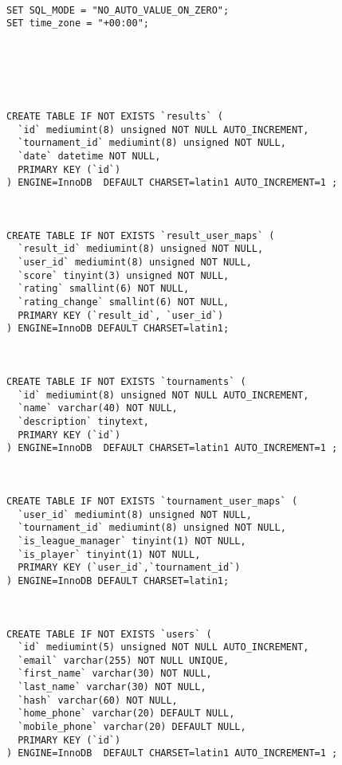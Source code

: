 {\scriptsize
\begin{lstlisting}

SET SQL_MODE = "NO_AUTO_VALUE_ON_ZERO";
SET time_zone = "+00:00";






CREATE TABLE IF NOT EXISTS `results` (
  `id` mediumint(8) unsigned NOT NULL AUTO_INCREMENT,
  `tournament_id` mediumint(8) unsigned NOT NULL,
  `date` datetime NOT NULL,
  PRIMARY KEY (`id`)
) ENGINE=InnoDB  DEFAULT CHARSET=latin1 AUTO_INCREMENT=1 ;



CREATE TABLE IF NOT EXISTS `result_user_maps` (
  `result_id` mediumint(8) unsigned NOT NULL,
  `user_id` mediumint(8) unsigned NOT NULL,
  `score` tinyint(3) unsigned NOT NULL,
  `rating` smallint(6) NOT NULL,
  `rating_change` smallint(6) NOT NULL,
  PRIMARY KEY (`result_id`, `user_id`)
) ENGINE=InnoDB DEFAULT CHARSET=latin1;



CREATE TABLE IF NOT EXISTS `tournaments` (
  `id` mediumint(8) unsigned NOT NULL AUTO_INCREMENT,
  `name` varchar(40) NOT NULL,
  `description` tinytext,
  PRIMARY KEY (`id`)
) ENGINE=InnoDB  DEFAULT CHARSET=latin1 AUTO_INCREMENT=1 ;



CREATE TABLE IF NOT EXISTS `tournament_user_maps` (
  `user_id` mediumint(8) unsigned NOT NULL,
  `tournament_id` mediumint(8) unsigned NOT NULL,
  `is_league_manager` tinyint(1) NOT NULL,
  `is_player` tinyint(1) NOT NULL,
  PRIMARY KEY (`user_id`,`tournament_id`)
) ENGINE=InnoDB DEFAULT CHARSET=latin1;



CREATE TABLE IF NOT EXISTS `users` (
  `id` mediumint(5) unsigned NOT NULL AUTO_INCREMENT,
  `email` varchar(255) NOT NULL UNIQUE,
  `first_name` varchar(30) NOT NULL,
  `last_name` varchar(30) NOT NULL,
  `hash` varchar(60) NOT NULL,
  `home_phone` varchar(20) DEFAULT NULL,
  `mobile_phone` varchar(20) DEFAULT NULL,
  PRIMARY KEY (`id`)
) ENGINE=InnoDB  DEFAULT CHARSET=latin1 AUTO_INCREMENT=1 ;

\end{lstlisting}
}

